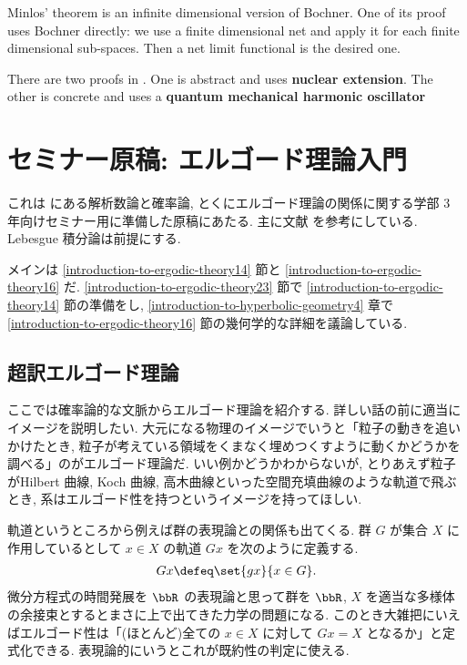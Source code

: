 \documentclass[openany, a4paper, oneside]{jsbook}
\begin{document}
Minlos' theorem is an infinite dimensional version of Bochner.
One of its proof uses Bochner directly: we use a finite dimensional net and apply it for each finite dimensional sub-spaces.
Then a net limit functional is the desired one.

There are two proofs in \cite{AsaoArai5}.
One is abstract and uses \textbf{nuclear extension}.
The other is concrete and uses a \textbf{quantum mechanical harmonic oscillator}
\chapter{セミナー原稿: エルゴード理論入門\label{introduction-to-ergodic-theory39}}

これは \cite{MarkKac1} にある解析数論と確率論,
とくにエルゴード理論の関係に関する学部 3 年向けセミナー用に準備した原稿にあたる.
主に文献 \cite{OmriSarig1, MarkKac1} を参考にしている.
Lebesgue 積分論は前提にする.

メインは \ref{introduction-to-ergodic-theory14} 節と \ref{introduction-to-ergodic-theory16} だ.
\ref{introduction-to-ergodic-theory23} 節で \ref{introduction-to-ergodic-theory14} 節の準備をし,
\ref{introduction-to-hyperbolic-geometry4} 章で \ref{introduction-to-ergodic-theory16} 節の幾何学的な詳細を議論している.
\section{超訳エルゴード理論}

ここでは確率論的な文脈からエルゴード理論を紹介する.
詳しい話の前に適当にイメージを説明したい.
大元になる物理のイメージでいうと「粒子の動きを追いかけたとき,
粒子が考えている領域をくまなく埋めつくすように動くかどうかを調べる」のがエルゴード理論だ.
いい例かどうかわからないが, とりあえず粒子がHilbert 曲線, Koch 曲線, 高木曲線といった空間充填曲線のような軌道で飛ぶとき,
系はエルゴード性を持つというイメージを持ってほしい.

軌道というところから例えば群の表現論との関係も出てくる.
群 $G$ が集合 $X$ に作用しているとして $x \in X$ の軌道 $Gx$ を次のように定義する.
\begin{align}
 Gx
 \defeq
 \set{gx}{x \in G}.
\end{align}
微分方程式の時間発展を $\bbR$ の表現論と思って群を $\bbR$,
$X$ を適当な多様体の余接束とするとまさに上で出てきた力学の問題になる.
このとき大雑把にいえばエルゴード性は「(ほとんど)全ての $x \in X$ に対して $Gx = X$ となるか」と定式化できる.
表現論的にいうとこれが既約性の判定に使える.
\end{document}
